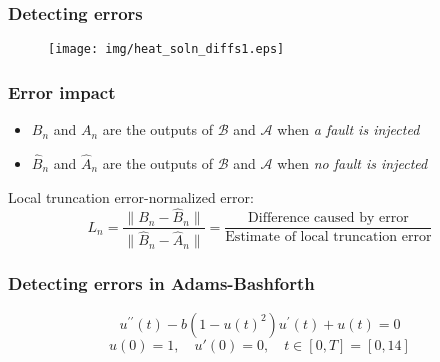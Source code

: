\documentclass{beamer}
\newcommand{\A}{\mathcal{A}}
\newcommand{\B}{\mathcal{B}}
\begin{document}

%
\begin{frame}
\frametitle{Detecting errors}

\begin{figure}
  \centering
  \texttt{[image: img/heat\_soln\_diffs1.eps]}
\end{figure}

\end{frame}


%
\begin{frame}
\frametitle{Error impact}

\begin{itemize}
\item $B_n$ and $A_n$ are the outputs of $\B$ and $\A$ when \emph{a fault is injected}
\item $\hat{B}_n$ and $\hat{A}_n$ are the outputs of $\B$ and $\A$ when \emph{no fault is injected}
\end{itemize}


Local truncation error-normalized error:
\[
L_n = \frac{\| B_n - \hat{B}_n \|}{\| \hat{B}_n - \hat{A}_n \|} = \frac{\text{Difference caused by error}}{\text{Estimate of local truncation error}}
\]

\end{frame}

%
\begin{frame}
\frametitle{Detecting errors in Adams-Bashforth}

\[
u^{\prime\prime}(t) - b(1 - u(t)^2)u^{\prime}(t) + u(t) = 0
\]
\[
u(0) = 1, \quad u'(0) = 0, \quad t \in [0, T] = [0, 14]
\]

\end{frame}
\end{document}

